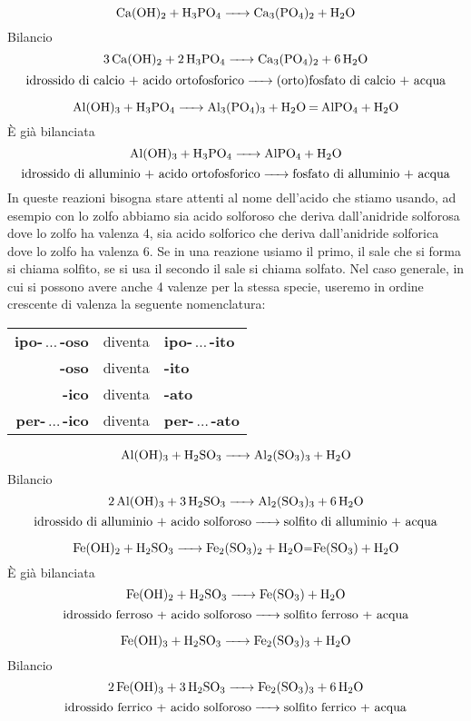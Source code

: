 $$\ce{Ca(OH)_2 + H_3PO_4 -> Ca_3(PO_4)_2 + H_2O}$$Bilancio
$$\ce{3 Ca(OH)_2 + 2 H_3PO_4 -> Ca_3(PO_4)_2 + 6 H_2O}$$
$$\text{idrossido di calcio + acido ortofosforico} \ce{->} \text{(orto)fosfato di calcio + acqua}$$

$$\ce{Al(OH)_3 + H_3PO_4 -> Al_3(PO_4)_3 + H_2O = AlPO_4 + H_2O}$$È già bilanciata
$$\ce{Al(OH)_3 + H_3PO_4 -> AlPO_4 + H_2O}$$
$$\text{idrossido di alluminio + acido ortofosforico} \ce{->} \text{fosfato di alluminio + acqua}$$
In queste reazioni bisogna stare attenti al nome dell'acido che stiamo usando, ad esempio con lo zolfo abbiamo sia acido solforoso  che deriva dall'anidride solforosa  dove lo zolfo ha valenza 4, sia acido solforico  che deriva dall'anidride solforica  dove lo zolfo ha valenza 6. Se in una reazione usiamo il primo, il sale che si forma si chiama solfito, se si usa il secondo il sale si chiama solfato. Nel caso generale, in cui si possono avere anche 4 valenze per la stessa specie, useremo in ordine crescente di valenza la seguente nomenclatura:
\begin{center}
   \begin{tabular}{rcl}
     \textbf{ipo-}$\,\dots\,$\textbf{-oso} & diventa & \textbf{ipo-}$\,\dots\,$\textbf{-ito}\\
     \textbf{-oso} & diventa & \textbf{-ito}\\
     \textbf{-ico} & diventa & \textbf{-ato}\\
     \textbf{per-}$\,\dots\,$\textbf{-ico} & diventa & \textbf{per-}$\,\dots\,$\textbf{-ato}
   \end{tabular}
   \end{center}


$$\ce{Al(OH)_3 + H_2SO_3 -> Al_2(SO_3)_3 + H_2O}$$Bilancio
$$\ce{2 Al(OH)_3 + 3 H_2SO_3 -> Al_2(SO_3)_3 + 6 H_2O}$$
$$\text{idrossido di alluminio + acido solforoso} \ce{->} \text{solfito di alluminio + acqua}$$

$$\ce{Fe(OH)_2 + H_2SO_3 -> Fe_2(SO_3)_2 + H_2O=Fe(SO_3) + H_2O}$$È già bilanciata
$$\ce{Fe(OH)_2 + H_2SO_3 -> Fe(SO_3) + H_2O}$$
$$\text{idrossido ferroso + acido solforoso} \ce{->} \text{solfito ferroso + acqua}$$

$$\ce{Fe(OH)_3 + H_2SO_3 -> Fe_2(SO_3)_3 + H_2O}$$Bilancio
$$\ce{2 Fe(OH)_3 + 3 H_2SO_3 -> Fe_2(SO_3)_3 + 6 H_2O}$$
$$\text{idrossido ferrico + acido solforoso} \ce{->} \text{solfito ferrico + acqua}$$

